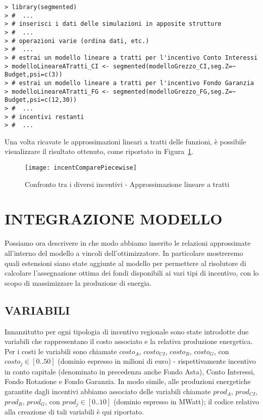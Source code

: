 \documentclass[12pt,a4paper,openright,twoside]{report}
\begin{document}
\lstset{language=R}
\begin{lstlisting}
> library(segmented)
> #  ...
> # inserisci i dati delle simulazioni in apposite strutture 
> #  ...
> # operazioni varie (ordina dati, etc.)
> #  ...
> # estrai un modello lineare a tratti per l'incentivo Conto Interessi
> modelloLineareATratti_CI <- segmented(modelloGrezzo_CI,seg.Z=~ Budget,psi=c(3))
> # estrai un modello lineare a tratti per l'incentivo Fondo Garanzia
> modelloLineareATratti_FG <- segmented(modelloGrezzo_FG,seg.Z=~ Budget,psi=c(12,30))
> #  ...
> # incentivi restanti
> #  ...
\end{lstlisting}

Una volta ricavate le approssimazioni lineari a tratti delle funzioni, è possibile visualizzare il risultato ottenuto, come riportato in Figura~\ref{incentCompare_piecewise}.

\begin{figure}[hbt]
	\centering
	\texttt{[image: incentComparePiecewise]}
	\caption{Confronto tra i diversi incentivi - Approssimazione lineare a tratti}
	\label{incentCompare_piecewise}
\end{figure}

\section{INTEGRAZIONE MODELLO}

Possiamo ora descrivere in che modo abbiamo inserito le relazioni approssimate all'interno del modello a vincoli dell'ottimizzatore. In particolare mostreremo quali estensioni siano state aggiunte al modello per permettere al risolutore di calcolare l'assegnazione ottima dei fondi disponibili ai vari tipi di incentivo, con lo scopo di massimizzare la produzione di energia.

\subsection{VARIABILI}

Innanzitutto per ogni tipologia di incentivo regionale sono state introdotte due variabili che rappresentano il costo associato e la relativa produzione energetica. Per i costi le variabili sono chiamate $costo_A$, $costo_{CI}$, $costo_R$, $costo_G$, con $costo_j \in[0..50]$ (dominio espresso in milioni di euro) - rispettivamente incentivo in conto capitale (denominato in precedenza anche Fondo Asta), Conto Interessi, Fondo Rotazione e Fondo Garanzia. In modo simile, alle produzioni energetiche garantite dagli incentivi abbiamo associato delle variabili chiamate $prod_A$, $prod_{CI}$, $prod_R$, $prod_G$, con $prod_j \in [0..10]$ (dominio espresso in MWatt); il codice relativo alla creazione di tali variabili è qui riportato.
\end{document}
